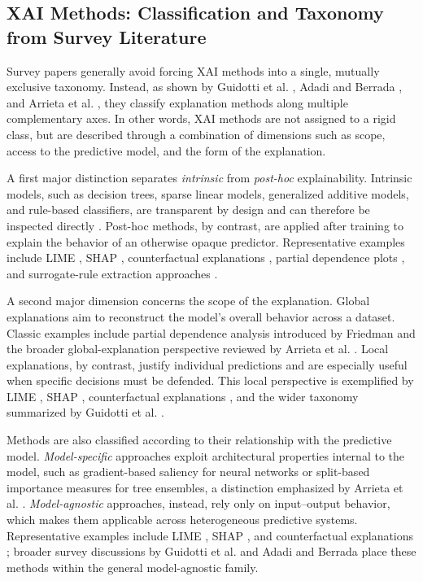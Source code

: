 \subsection{XAI Methods: Classification and Taxonomy from Survey Literature}
Survey papers generally avoid forcing XAI methods into a single, mutually exclusive taxonomy. Instead, as shown by Guidotti et al. \cite{guidotti2018survey}, Adadi and Berrada \cite{adadi2018peeking}, and Arrieta et al. \cite{arrieta2020explainable}, they classify explanation methods along multiple complementary axes. In other words, XAI methods are not assigned to a rigid class, but are described through a combination of dimensions such as scope, access to the predictive model, and the form of the explanation.

A first major distinction separates \emph{intrinsic} from \emph{post-hoc} explainability. Intrinsic models, such as decision trees, sparse linear models, generalized additive models, and rule-based classifiers, are transparent by design and can therefore be inspected directly \cite{molnar2022iml,arrieta2020explainable}. Post-hoc methods, by contrast, are applied after training to explain the behavior of an otherwise opaque predictor. Representative examples include LIME \cite{ribeiro2016lime}, SHAP \cite{lundberg2017shap}, counterfactual explanations \cite{wachter2017counterfactual}, partial dependence plots \cite{friedman2001pdp}, and surrogate-rule extraction approaches \cite{guidotti2018survey,adadi2018peeking}.

A second major dimension concerns the scope of the explanation. Global explanations aim to reconstruct the model's overall behavior across a dataset. Classic examples include partial dependence analysis introduced by Friedman \cite{friedman2001pdp} and the broader global-explanation perspective reviewed by Arrieta et al. \cite{arrieta2020explainable}. Local explanations, by contrast, justify individual predictions and are especially useful when specific decisions must be defended. This local perspective is exemplified by LIME \cite{ribeiro2016lime}, SHAP \cite{lundberg2017shap}, counterfactual explanations \cite{wachter2017counterfactual}, and the wider taxonomy summarized by Guidotti et al. \cite{guidotti2018survey}.

Methods are also classified according to their relationship with the predictive model. \emph{Model-specific} approaches exploit architectural properties internal to the model, such as gradient-based saliency for neural networks or split-based importance measures for tree ensembles, a distinction emphasized by Arrieta et al. \cite{arrieta2020explainable}. \emph{Model-agnostic} approaches, instead, rely only on input--output behavior, which makes them applicable across heterogeneous predictive systems. Representative examples include LIME \cite{ribeiro2016lime}, SHAP \cite{lundberg2017shap}, and counterfactual explanations \cite{wachter2017counterfactual}; broader survey discussions by Guidotti et al. \cite{guidotti2018survey} and Adadi and Berrada \cite{adadi2018peeking} place these methods within the general model-agnostic family.


